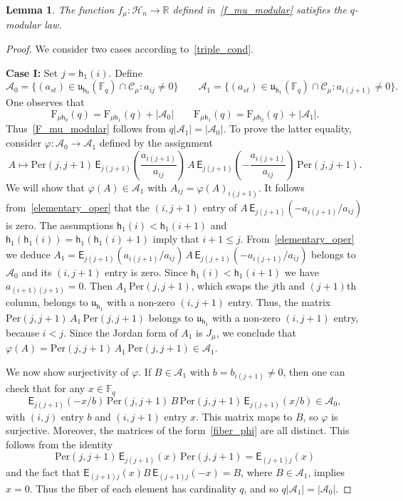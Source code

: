 \documentclass[12pt,a4paper,reqno]{amsart}
\theoremstyle{plain}
\newtheorem{lemma}[theorem]{Lemma}
\theoremstyle{definition}
\newcommand{\FF}{{\mathbb{F}}}
\newcommand{\1}{\mathds{1}}
\newcommand{\F}{\mathrm{F}}
\renewcommand{\u}{\mathfrak{u}}
\newcommand{\hes}{\mathsf{h}}
\newcommand{\EE}{\mathsf{E}}
\begin{document}
\begin{lemma}
\label{lem:modularl}
 The function $f_\mu: \mathcal{H}_n\to \mathbb{R}$ defined in~\cref{f_mu_modular} satisfies the $q$-modular law. 
\end{lemma}
\begin{proof}
We consider two cases according to~\cref{triple_cond}. 
\medskip

{\noindent \bf Case I:} Set $j=\hes_1(i)$. Define 
$$
\mathcal{A}_0=\{(a_{st})\in \u_{\hes_0}(\FF_q)\cap \mathcal{C_\mu}: a_{ij}\neq 0\}\qquad
\mathcal{A}_1=\{(a_{st})\in \u_{\hes_1}(\FF_q)\cap \mathcal{C_\mu}: a_{i(j+1)}\neq 0\}.
$$
One observes that
$$
\F_{\mu\hes_0}(q)=\F_{\mu\hes_1}(q)+|\mathcal{A}_0|\qquad
\F_{\mu\hes_1}(q)=\F_{\mu\hes_2}(q)+|\mathcal{A}_1|. 
$$
Thus~\cref{F_mu_modular} follows from $q|\mathcal{A}_1|=|\mathcal{A}_0|$. To prove the latter equality, consider 
$\varphi: \mathcal{A}_0\to \mathcal{A}_1$ defined by the assignment
$$
A\mapsto \mathrm{Per}(j,j+1)\,\EE_{j(j+1)}\left(\frac{a_{i(j+1)}}{a_{ij}}\right)\,A\,\EE_{j(j+1)}\left(-\frac{a_{i(j+1)}}{a_{ij}}\right)\,\mathrm{Per}(j,j+1).
$$
We will show that $\varphi(A)\in\mathcal{A}_1$ with $A_{ij}=\varphi(A)_{i(j+1)}$. 
It follows from~\cref{elementary_oper} that the $(i,j+1)$ entry of $A\,\EE_{j(j+1)}\left(-{a_{i(j+1)}}/{a_{ij}}\right)$ is zero. The assumptions $\hes_1(i)<\hes_1(i+1)$ and $\hes_1(\hes_1(i))=\hes_1(\hes_1(i)+1)$ imply that $i+1\leq j$. From~\cref{elementary_oper} we deduce  $A_1=\EE_{j(j+1)}\left({a_{i(j+1)}}/{a_{ij}}\right)\,A\,\EE_{j(j+1)}\left(-{a_{i(j+1)}}/{a_{ij}}\right)$ belongs to $\mathcal{A}_0$ and its $(i,j+1)$ entry is zero. Since $\hes_1(i)<\hes_1(i+1)$ we have $a_{(i+1)(j+1)}=0$. Then $A_1\, \mathrm{Per}(j,j+1)$, which swaps the $j$th and $(j+1)$th column, belongs to $\u_{\hes_1}$ with a non-zero $(i,j+1)$ entry. Thus, the matrix $\mathrm{Per}(j,j+1)\, A_1\, \mathrm{Per}(j,j+1)$ belongs to $\u_{\hes_1}$ with a non-zero $(i,j+1)$ entry, because $i<j$. Since the Jordan form of $A_1$ is $J_\mu$, we conclude that $\varphi(A) = \mathrm{Per}(j,j+1)\, A_1\, \mathrm{Per}(j,j+1) \in \mathcal{A}_1$.


\smallskip

We now show surjectivity of $\varphi$. If $B\in \mathcal{A}_1$ with $b=b_{i(j+1)}\neq 0$, then one can check that for any $x\in\FF_q$ 
\begin{equation}\label{fiber_phi}
\EE_{j(j+1)}(-x/b)\,\mathrm{Per}(j,j+1)\,B\,\mathrm{Per}(j,j+1)\,\EE_{j(j+1)}(x/b)\in \mathcal{A}_0,
\end{equation}
with $(i,j)$ entry $b$ and $(i,j+1)$ entry $x$. This matrix maps to $B$, so $\varphi$ is surjective. Moreover, the matrices of the form~\cref{fiber_phi} are all distinct. This follows from the identity $$\mathrm{Per}(j,j+1)\,\EE_{j(j+1)}(x)\,\mathrm{Per}(j,j+1) = \EE_{(j+1)j}(x)$$
and the fact that $\EE_{(j+1)j}(x) B\, \EE_{(j+1)j}(-x) = B$, where $B \in \mathcal{A}_1$, implies $x = 0$. Thus the fiber of each element has cardinality $q$, and so $q|\mathcal{A}_1|=|\mathcal{A}_0|$.


\end{proof}
\end{document}
